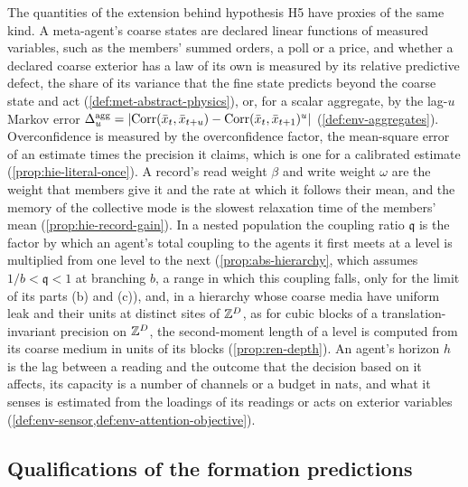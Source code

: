 The quantities of the extension behind hypothesis H5 have proxies of the same kind. A meta-agent's coarse states are declared linear functions of measured variables, such as the members' summed orders, a poll or a price, and whether a declared coarse exterior has a law of its own is measured by its relative predictive defect, the share of its variance that the fine state predicts beyond the coarse state and act (\cref{def:met-abstract-physics}), or, for a scalar aggregate, by the lag-$u$ Markov error $\Delta^{\mathrm{agg}}_u=\lvert\operatorname{Corr}(\bar x_t,\bar x_{t+u})-\operatorname{Corr}(\bar x_t,\bar x_{t+1})^u\rvert$ (\cref{def:env-aggregates}). Overconfidence is measured by the overconfidence factor, the mean-square error of an estimate times the precision it claims, which is one for a calibrated estimate (\cref{prop:hie-literal-once}). A record's read weight $\beta$ and write weight $\omega$ are the weight that members give it and the rate at which it follows their mean, and the memory of the collective mode is the slowest relaxation time of the members' mean (\cref{prop:hie-record-gain}). In a nested population the coupling ratio $\mathfrak q$ is the factor by which an agent's total coupling to the agents it first meets at a level is multiplied from one level to the next (\cref{prop:abs-hierarchy}, which assumes $1/b<\mathfrak q<1$ at branching $b$, a range in which this coupling falls, only for the limit of its parts (b) and (c)), and, in a hierarchy whose coarse media have uniform leak and their units at distinct sites of $\mathbb{Z}^D$, as for cubic blocks of a translation-invariant precision on $\mathbb{Z}^D$, the second-moment length of a level is computed from its coarse medium in units of its blocks (\cref{prop:ren-depth}). An agent's horizon $h$ is the lag between a reading and the outcome that the decision based on it affects, its capacity is a number of channels or a budget in nats, and what it senses is estimated from the loadings of its readings or acts on exterior variables (\cref{def:env-sensor,def:env-attention-objective}).

\subsection{Qualifications of the formation predictions}\label{sup:pre-qualifications-of-the-formation-predicti}

